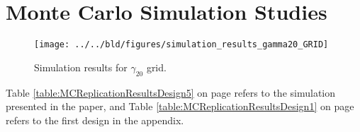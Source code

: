 \section{Monte Carlo Simulation Studies}

\begin{figure}
    \centering
    \texttt{[image: ../../bld/figures/simulation\_results\_gamma20\_GRID]}
    \caption{Simulation results for $\gamma_{20}$ grid.}
    \label{fig:gamma20_grid}
\end{figure}







Table \ref{table:MCReplicationResultsDesign5} on page \pageref{table:MCReplicationResultsDesign5} refers
to the simulation presented in the paper, and Table \ref{table:MCReplicationResultsDesign1} on page \pageref{table:MCReplicationResultsDesign1}
refers to the first design in the appendix.
